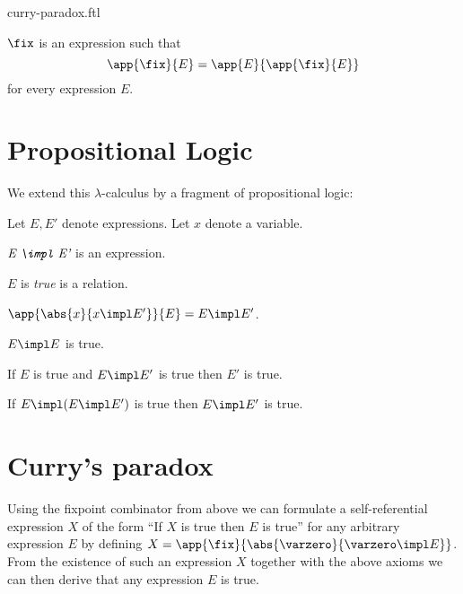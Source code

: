 \documentclass{stex}
\begin{document}
\begin{smodule}{curry-paradox.ftl}
\begin{forthel}
  \begin{signature*}[title=Fixed-point combinator,for=fix]
    $\fix$ is an expression such that
    \[\app{\fix}{E} = \app{E}{\app{\fix}{E}}\]
    for every expression $E$.
  \end{signature*}
\end{forthel}


\section*{Propositional Logic}

\noindent We extend this $\lambda$-calculus by a fragment of propositional
logic:

\begin{forthel}  
  Let $E, E'$ denote expressions.
  Let $x$ denote a variable.

  \begin{signature*}[title=Implication,for=impl]
    $\emph{E \impl E'}$ is an expression.
  \end{signature*}

  \begin{signature*}[title=Truth,for=true]
    $E$ is \emph{true} is a relation.
  \end{signature*}

  \begin{axiom*}[title=$\beta$-reduction,name=beta reduction]
    $\app{\abs{x}{x \impl E'}}{E} = E \impl E'$.
  \end{axiom*}

  \begin{axiom*}[title=Reflexivity,name=reflexivity]
    $E \impl E$ is true.
  \end{axiom*}

  \begin{axiom*}[title=Modus Ponens,name=modus ponens]
    If $E$ is true and $E \impl E'$ is true then $E'$ is true.
  \end{axiom*}

  \begin{axiom*}[title=Strengthening,name=strengthening]
    If $E \impl (E \impl E')$ is true then $E \impl E'$ is true.
  \end{axiom*}
\end{forthel}


\section*{Curry's paradox}

\noindent Using the fixpoint combinator from above we can formulate a 
self-referential expression $X$ of the form ``If $X$ is true then $E$ is
true'' for any arbitrary expression $E$ by defining
$X = \app{\fix}{\abs{\varzero}{\varzero \impl E}}$.
From the existence of such an expression $X$ together with the above axioms 
we can then derive that any expression $E$ is true.


\end{smodule}
\end{document}
